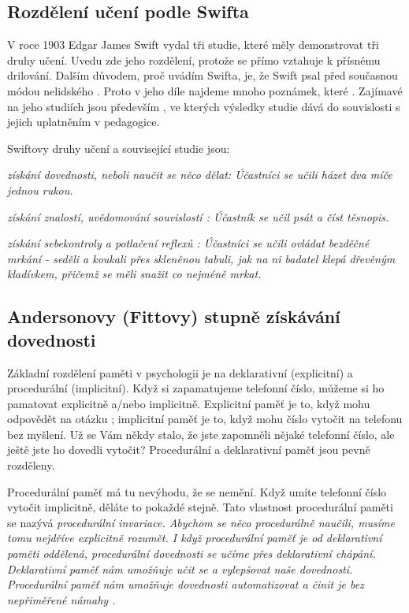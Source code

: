 \subsection{Rozdělení učení podle Swifta}

V roce 1903 Edgar James Swift vydal tři studie, které měly demonstrovat tři druhy učení. Uvedu zde jeho rozdělení, protože se přímo vztahuje k přísnému drilování.  Dalším důvodem, proč uvádím Swifta, je, že Swift psal před současnou módou nelidského .  Proto v jeho díle najdeme mnoho poznámek, které .  Zajímavé na jeho studiích jsou především , ve kterých výsledky studie dává do souvislosti s jejich uplatněním v pedagogice. %

Swiftovy druhy učení a související studie jsou:

\em získání dovednosti, neboli naučit se něco dělat\em : Účastníci se učili házet dva míče jednou rukou. %

\em získání znalostí, uvědomování souvislostí \em : Účastník se učil psát a číst těsnopis.  %

\em získání sebekontroly a potlačení reflexů \em : Účastníci se učili ovládat bezděčné mrkání - seděli a koukali přes skleněnou tabuli, jak na ni badatel klepá dřevěným kladívkem, přičemž se měli snažit co nejméně mrkat.  %

 \citep[str.201,224,230,231]{swift1903studies}

\subsection{Andersonovy (Fittovy) stupně získávání dovednosti} %

Základní rozdělení paměti v psychologii je na deklarativní (explicitní) a procedurální (implicitní).  Když si zapamatujeme telefonní číslo, můžeme si ho pamatovat explicitně a/nebo implicitně. Explicitní paměť je to, když mohu odpovědět na otázku ; implicitní paměť je to, když mohu číslo vytočit na telefonu bez myšlení. Už se Vám někdy stalo, že jste zapomněli nějaké telefonní číslo, ale ještě jste ho dovedli vytočit?  Procedurální a deklarativní paměť jsou pevně rozděleny.

Procedurální paměť má tu nevýhodu, že se nemění.  Když umíte telefonní číslo vytočit implicitně, děláte to pokaždé stejně.  Tato vlastnost procedurální paměti se nazývá \em procedurální invariace\em . Abychom se něco procedurálně naučili, musíme tomu nejdříve explicitně rozumět.  I když procedurální paměť je od deklarativní paměti oddělená, procedurální dovednosti se učíme přes deklarativní chápání.  Deklarativní paměť nám umožňuje učit se a vylepšovat naše dovednosti.  Procedurální paměť nám umožňuje dovednosti automatizovat a činit je bez nepřiměřené námahy \citep[str. 105]{robert1994handbook}.

